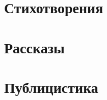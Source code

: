 \documentclass[12pt]{book}
\begin{document}
%

\tableofcontents
%

\part{Стихотворения}


\part{Рассказы}


\part{Публицистика}


%



\end{document}

